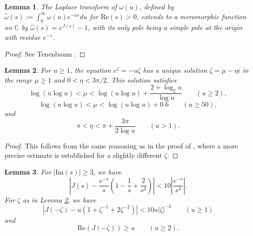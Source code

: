 \documentclass[11pt]{amsart}
\newtheorem{lemma}{Lemma}
\begin{document}
\begin{lemma}\label{lemlap}
The Laplace transform of $\omega(u)$, defined by $\widehat{\omega}(s):=\int_0^\infty \omega(u)e^{-us}du$ for $\mathrm{Re}(s) >0$, 
extends to a meromorphic function on $\mathbb{C}$ by $\widehat{\omega}(s)=e^{J(s)}-1$, with its only pole being a simple pole at the origin
with residue $e^{-\gamma}$. 
\end{lemma}
\begin{proof}
See Tenenbaum \cite[Thm.~III.6.7]{Ten}.
\end{proof}



\begin{lemma}\label{lemzeta}
For $u\ge 1$, the equation $e^\zeta=-u\zeta$ has a unique solution $\zeta=\mu-\eta i$ in the range $\mu \ge 1$ and $ 0< \eta <3\pi/2$.
This solution satisfies
$$
\log(u\log u)< \mu < \log(u\log u) + \frac{2+\log_2 u}{\log u} \qquad (u\ge 2),
$$
$$
\log(u\log u)< \mu < \log(u\log u) +0.6 \qquad (u\ge 50),
$$
and
$$ \pi <\eta < \pi +  \frac{3 \pi}{2\log u}  \qquad (u > 1).$$
\end{lemma}
\begin{proof}
This follows from the same reasoning as in the proof of \cite[Lem.~4]{Hil},
where a more precise estimate is established for a slightly different $\zeta$. 
\end{proof}

\begin{lemma}\label{lemJ}
For $|\mathrm{Im}(s)| \ge 3$, we have
\begin{equation}\label{eqlemJ}
\left|J(s)-\frac{e^{-s}}{s}\left(1-\frac{1}{s}+\frac{2}{s^2}\right) \right| < 10 \left|\frac{e^{-s}}{s^4}\right|.
\end{equation}
For $\zeta$ as in Lemma \ref{lemzeta}, we have 
$$
\left|J(-\zeta)-u(1+\zeta^{-1}+2\zeta^{-2})\right| < 10 u |\zeta|^{-3} \qquad (u\ge 1)
$$
and
$$
\mathrm{Re}(J(-\zeta)) \ge u \qquad (u\ge  2).
$$
\end{lemma}
\end{document}
